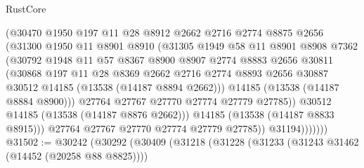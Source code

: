 \begin{lexlean}{RustCore}
\begin{coremodule}
                        (@30470
                          @1950
                          @197
                          @11
                          @28
                          @8912
                          @2662
                          @2716
                          @2774
                          @8875
                          @2656
                          (@31300
                            @1950
                            @11
                            @8901
                            @8910
                            (@31305
                              @1949
                              @58
                              @11
                              @8901
                              @8908
                              @7362
                              (@30792
                                @1948
                                @11
                                @57
                                @8367
                                @8900
                                @8907
                                @2774
                                @8883
                                @2656
                                @30811
                                (@30868
                                  @197
                                  @11
                                  @28
                                  @8369
                                  @2662
                                  @2716
                                  @2774
                                  @8893
                                  @2656
                                  @30887
                                  @30512
                                  @14185
                                  (@13538 (@14187 @8894 @2662)))
                                @14185
                                (@13538 (@14187 @8884 @8900)))
                              @27764
                              @27767
                              @27770
                              @27774
                              @27779
                              @27785))
                          @30512
                          @14185
                          (@13538 (@14187 @8876 @2662)))
                        @14185
                        (@13538 (@14187 @8833 @8915)))
                      @27764
                      @27767
                      @27770
                      @27774
                      @27779
                      @27785))
                  @31194)))))))
@31502 := @30242
    (@30292
      (@30409
        (@31218
          (@31228
            (@31233 (@31243 @31462 (@14452 (@20258 @88 @8825))))

\end{coremodule}
\end{lexlean}
